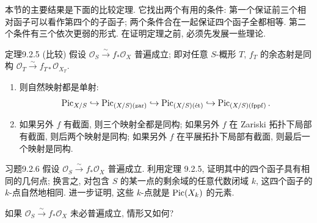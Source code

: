 本节的主要结果是下面的比较定理. 它找出两个有用的条件: 第一个保证前三个相对函子可以看作第四个的子函子; 两个条件合在一起保证四个函子全都相等. 第二个条件有三个依次更弱的形式. 在证明定理之前, 必须先发展一些理论.

\begin{origstatement}{定理}{9.2.5 (比较)}\label{ch09s02:thm925}
假设 $\mathcal O_S\xrightarrow{\sim}f_*\mathcal O_X$ 普遍成立; 即对任意 $S$-概形 $T$, $f_T$ 的余态射是同构 $\mathcal O_T\xrightarrow{\sim}f_{T*}\mathcal O_{X_T}$.
\begin{enumerate}
\item[1.] 则自然映射都是单射:
\[
\Pic_{X/S}\hookrightarrow\PZ\hookrightarrow\PE\hookrightarrow\PF.
\]
\item[2.] 如果另外 $f$ 有截面, 则三个映射全都是同构; 如果另外 $f$ 在 Zariski 拓扑下局部有截面, 则后两个映射是同构; 如果另外 $f$ 在平展拓扑下局部有截面, 则最后一个映射是同构.
\end{enumerate}
\end{origstatement}

\begin{origstatement}{习题}{9.2.6}\label{ch09s02:ex926}
假设 $\mathcal O_S\xrightarrow{\sim}f_*\mathcal O_X$ 普遍成立. 利用定理 9.2.5, 证明其中的四个函子具有相同的几何点; 换言之, 对包含 $S$ 的某一点的剩余域的任意代数闭域 $k$, 这四个函子的 $k$-点自然地相同. 进一步证明, 这些 $k$-点就是 $\Pic(X_k)$ 的元素.

如果 $\mathcal O_S\xrightarrow{\sim}f_*\mathcal O_X$ 未必普遍成立, 情形又如何?
\end{origstatement}

